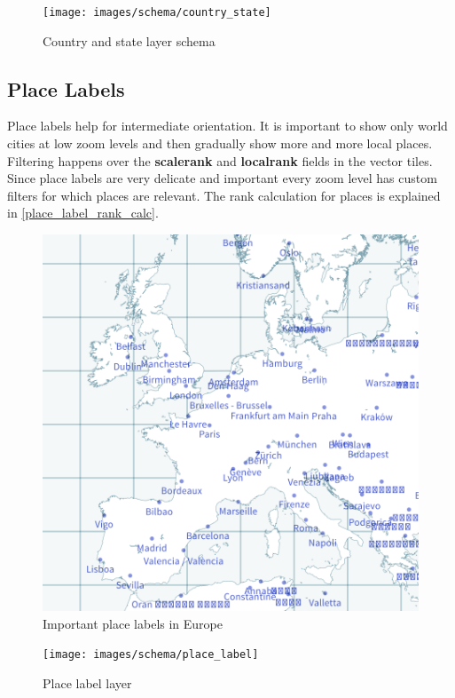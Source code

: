 \begin{figure}[H]
  \centering
  \texttt{[image: images/schema/country\_state]}
  \caption{Country and state layer schema}
\end{figure}

\subsection{Place Labels}

\noindent\begin{minipage}[t]{0.48\linewidth}
    \vspace{0pt}
    Place labels help for intermediate orientation. It is important to show only
    world cities at low zoom levels and then gradually show more and more local places. Filtering happens over the \textbf{scalerank} and \textbf{localrank}
    fields in the vector tiles. Since place labels are very delicate and important
    every zoom level has custom filters for which places are relevant.
    The rank calculation for places is explained in \autoref{place_label_rank_calc}.
\end{minipage}
\hfill
\begin{minipage}[t]{0.48\linewidth}
    \vspace{-20pt}
    \begin{figure}[H]
      \includegraphics[width=1\textwidth]{images/schema/place_example}
      \caption{Important place labels in Europe}
    \end{figure}
\end{minipage}

\begin{figure}[H]
  \centering
  \texttt{[image: images/schema/place\_label]}
  \caption{Place label layer }
\end{figure}
